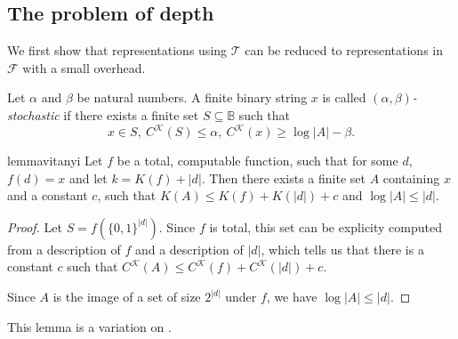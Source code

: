 \documentclass{style/llncs}
\newcommand{\T}{\mathscr T}
\newcommand{\F}{\mathscr F}
\newcommand{\K}{\mathscr K}
\newcommand{\B}{\mathbb B}
\begin{document}
\subsection{The problem of depth}

We first show that representations using $\T$ can be reduced to representations in $\F$ with a small overhead.

\begin{definition}
  Let $\alpha$ and $\beta$ be natural numbers. A finite binary string $x$ is called \emph{$(\alpha,\beta)$-stochastic} if there exists a finite set $S\subseteq\B$ such that 
  \[
  x\in S,~C^\K(S)\le\alpha,~C^\K(x)\ge\log|A|-\beta.
\]
\end{definition}

\begin{restatable}{lemma}{vitanyi}
Let $f$ be a total, computable function, such that for some $d$, $f(d) = x$ and let $k = K(f) + |d|$. Then there exists a finite set $A$ containing $x$ and a constant $c$, such that $K(A) \leq K(f) + K(|d|) + c$ and $\log |A| \leq |d|$.\label{lemma:total-to-sets}
\end{restatable}
\begin{proof}
Let $S = f\left(\{0,1\}^{|d|}\right)$. Since $f$ is total, this set can be explicity computed from a description of $f$ and a description of $|d|$, which tells us that there is a constant $c$ such that $C^\K(A) \leq C^\K(f) + C^\K(|d|) + c$. 

Since $A$ is the image of a set of size $2^{|d|}$ under $f$, we have $\log |A| \leq |d|$.
\end{proof}
\noindent This lemma is a variation on \cite[Lemma~7.2]{vitanyi2004meaningful}. 
\end{document}
